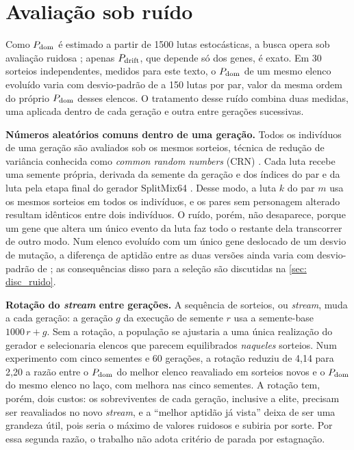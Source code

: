 \section{Avaliação sob ruído}
\label{sec: ruido}

Como $P_{\mathrm{dom}}$ é estimado a partir de 1500 lutas estocásticas, a busca opera sob avaliação ruidosa \cite{jin2005evolutionary}; apenas $P_{\mathrm{drift}}$, que depende só dos genes, é exato. Em 30 sorteios independentes, medidos para este texto, o $P_{\mathrm{dom}}$ de um mesmo elenco evoluído varia com desvio-padrão de \ruidoDomDpTreino{} a 150 lutas por par, valor da mesma ordem do próprio $P_{\mathrm{dom}}$ desses elencos. O tratamento desse ruído combina duas medidas, uma aplicada dentro de cada geração e outra entre gerações sucessivas.

\textbf{Números aleatórios comuns dentro de uma geração.} Todos os indivíduos de uma geração são avaliados sob os mesmos sorteios, técnica de redução de variância conhecida como \textit{common random numbers} (CRN) \cite{law2015simulation}. Cada luta recebe uma semente própria, derivada da semente da geração e dos índices do par e da luta pela etapa final do gerador SplitMix64 \cite{steele2014fast}. Desse modo, a luta $k$ do par $m$ usa os mesmos sorteios em todos os indivíduos, e os pares sem personagem alterado resultam idênticos entre dois indivíduos. O ruído, porém, não desaparece, porque um gene que altera um único evento da luta faz todo o restante dela transcorrer de outro modo. Num elenco evoluído com um único gene deslocado de um desvio de mutação, a diferença de aptidão entre as duas versões ainda varia com desvio-padrão de \crnDpDiferenca{}; as consequências disso para a seleção são discutidas na \autoref{sec: disc_ruido}.

\textbf{Rotação do \textit{stream} entre gerações.} A sequência de sorteios, ou \textit{stream}, muda a cada geração: a geração $g$ da execução de semente $r$ usa a semente-base $1000\,r + g$. Sem a rotação, a população se ajustaria a uma única realização do gerador e selecionaria elencos que parecem equilibrados \textit{naqueles} sorteios. Num experimento com cinco sementes e 60 gerações, a rotação reduziu de 4,14 para 2,20 a razão entre o $P_{\mathrm{dom}}$ do melhor elenco reavaliado em sorteios novos e o $P_{\mathrm{dom}}$ do mesmo elenco no laço, com melhora nas cinco sementes. A rotação tem, porém, dois custos: os sobreviventes de cada geração, inclusive a elite, precisam ser reavaliados no novo \textit{stream}, e a ``melhor aptidão já vista'' deixa de ser uma grandeza útil, pois seria o máximo de valores ruidosos e subiria por sorte. Por essa segunda razão, o trabalho não adota critério de parada por estagnação.


